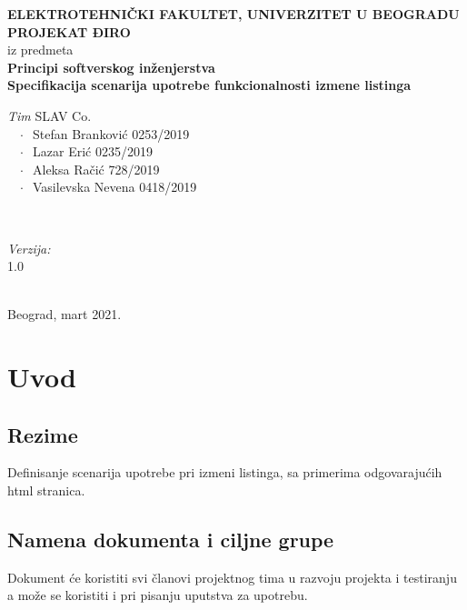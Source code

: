 \documentclass[12pt]{article}
\begin{document}
    \renewcommand{\labelenumii}{\arabic{enumi}.\arabic{enumii}}
	\begin{titlepage}  
		\center
		\textbf{ \LARGE ELEKTROTEHNIČKI FAKULTET, UNIVERZITET U BEOGRADU } \\[4cm]
		\textbf{ \Large PROJEKAT ĐIRO\texttrademark} \\[0.3cm]
		iz predmeta \\[0.3cm]
		\textbf{ \Large Principi softverskog inženjerstva} \\[0.7cm]
		{ \huge \bfseries Specifikacija scenarija upotrebe funkcionalnosti izmene listinga } \\[6cm]
		

		\begin{minipage}{0.5\textwidth}
			\begin{flushleft}
				\large
				\emph{Tim} SLAV Co. \\
			     $\;\;\; \cdot \;\;$Stefan Branković  0253/2019\\
			     $\;\;\; \cdot \;\;$Lazar Erić 0235/2019\\
			     $\;\;\; \cdot \;\;$Aleksa Račić 728/2019\\
			     $\;\;\; \cdot \;\;$Vasilevska Nevena 0418/2019
			\end{flushleft}
		\end{minipage}
		~
		\begin{minipage}{0.4\textwidth}
			\begin{flushright}
				\large
				\emph{Verzija:} \\
				1.0
			\end{flushright}
		\end{minipage} \\[2cm]
		\enlargethispage{4\baselineskip}
		{ \large Beograd, mart 2021. }
		\vfill
	\end{titlepage}
\pagebreak
\tableofcontents
\pagebreak



\section{Uvod}
\subsection{Rezime}
Definisanje scenarija upotrebe pri izmeni listinga, sa primerima odgovarajućih html stranica.
\subsection{Namena dokumenta i ciljne grupe}
Dokument će koristiti svi članovi projektnog tima u razvoju projekta i testiranju a može se koristiti i pri pisanju uputstva za
upotrebu.
\end{document}
